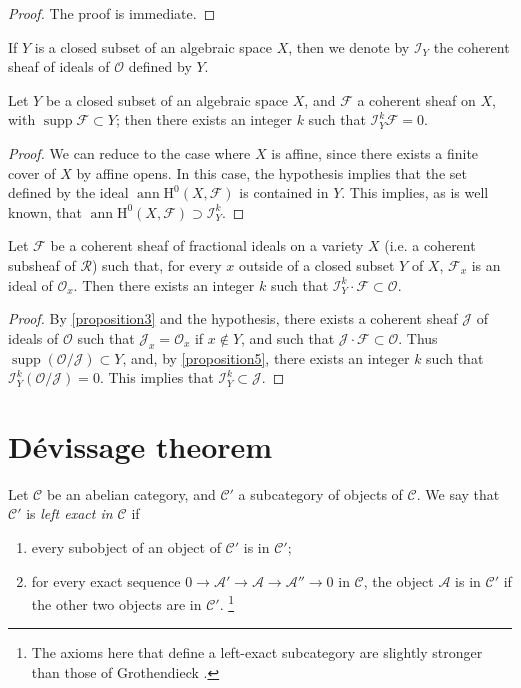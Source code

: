 \documentclass{article}
\theoremstyle{plain}
\newenvironment{proposition}[1]
    {\renewcommand\theinnercustomproposition{#1}\innercustomproposition}
    {\endinnercustomproposition}
\theoremstyle{definition}
\newcommand{\sh}{\mathscr}
\newcommand{\cat}{\mathcal}
\newcommand{\HH}{\mathrm{H}}
\DeclareMathOperator{\ann}{ann}
\DeclareMathOperator{\supp}{supp}
\newcommand{\oldpage}[1]{\marginpar{\footnotesize$\Big\vert$ \textit{p.~#1}}}
\begin{document}
\begin{proof}
  The proof is immediate.
\end{proof}

\oldpage{4-03}
If $Y$ is a closed subset of an algebraic space $X$, then we denote by $\sh{I}_Y$ the coherent sheaf of ideals of $\sh{O}$ defined by $Y$.

\begin{proposition}{5}
\label{proposition5}
  Let $Y$ be a closed subset of an algebraic space $X$, and $\sh{F}$ a coherent sheaf on $X$, with $\supp\sh{F}\subset Y$;
  then there exists an integer $k$ such that $\sh{I}_Y^k\sh{F}=0$.
\end{proposition}

\begin{proof}
  We can reduce to the case where $X$ is affine, since there exists a finite cover of $X$ by affine opens.
  In this case, the hypothesis implies that the set defined by the ideal $\ann\HH^0(X,\sh{F})$ is contained in $Y$.
  This implies, as is well known, that $\ann\HH^0(X,\sh{F})\supset\sh{I}_Y^k$.
\end{proof}

\begin{proposition}{6}
\label{proposition6}
  Let $\sh{F}$ be a coherent sheaf of fractional ideals on a variety $X$ (i.e. a coherent subsheaf of $\sh{R}$) such that, for every $x$ outside of a closed subset $Y$ of $X$, $\sh{F}_x$ is an ideal of $\sh{O}_x$.
  Then there exists an integer $k$ such that $\sh{I}_Y^k\cdot\sh{F}\subset\sh{O}$.
\end{proposition}

\begin{proof}
  By \cref{proposition3} and the hypothesis, there exists a coherent sheaf $\sh{J}$ of ideals of $\sh{O}$ such that $\sh{J}_x=\sh{O}_x$ if $x\not\in Y$, and such that $\sh{J}\cdot\sh{F}\subset\sh{O}$.
  Thus $\supp(\sh{O}/\sh{J})\subset Y$, and, by \cref{proposition5}, there exists an integer $k$ such that $\sh{I}_Y^k(\sh{O}/\sh{J})=0$.
  This implies that $\sh{I}_Y^k\subset\sh{J}$.
\end{proof}


\section{D\'{e}vissage theorem}
\label{section2}

Let $\cat{C}$ be an abelian category, and $\cat{C}'$ a subcategory of objects of $\cat{C}$.
We say that $\cat{C}'$ is \emph{left exact in $\cat{C}$} if
\begin{enumerate}
  \item every subobject of an object of $\cat{C}'$ is in $\cat{C}'$;
  \item for every exact sequence $0\to\sh{A}'\to\sh{A}\to\sh{A}''\to0$ in $\cat{C}$, the object $\sh{A}$ is in $\cat{C}'$ if the other two objects are in $\cat{C}'$.
  \footnote{The axioms here that define a left-exact subcategory are slightly stronger than those of Grothendieck \cite{4}.}
\end{enumerate}
\end{document}
